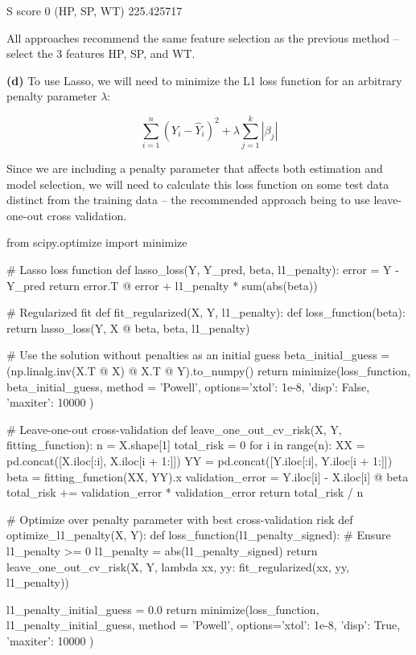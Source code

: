 \begin{console}
              S       score
0  (HP, SP, WT)  225.425717
\end{console}

All approaches recommend the same feature selection as the previous
method -- select the 3 features HP, SP, and WT.

\textbf{(d)} To use Lasso, we will need to minimize the L1 loss function
for an arbitrary penalty parameter \(\lambda\):

\[ \sum_{i=1}^n (Y_i - \hat{Y}_i)^2 + \lambda \sum_{j=1}^k | \beta_j | \]

Since we are including a penalty parameter that affects both estimation
and model selection, we will need to calculate this loss function on
some test data distinct from the training data -- the recommended
approach being to use leave-one-out cross validation.

\begin{python}
from scipy.optimize import minimize

# Lasso loss function
def lasso_loss(Y, Y_pred, beta, l1_penalty):
    error = Y - Y_pred
    return error.T @ error + l1_penalty * sum(abs(beta))

# Regularized fit
def fit_regularized(X, Y, l1_penalty):
    def loss_function(beta):
        return lasso_loss(Y, X @ beta, beta, l1_penalty)
    
    # Use the solution without penalties as an initial guess
    beta_initial_guess = (np.linalg.inv(X.T @ X) @ X.T @ Y).to_numpy()
    return minimize(loss_function, beta_initial_guess, method = 'Powell',
                    options={'xtol': 1e-8, 'disp': False, 'maxiter': 10000 }) 

# Leave-one-out cross-validation
def leave_one_out_cv_risk(X, Y, fitting_function):
    n = X.shape[1]
    total_risk = 0
    for i in range(n):
        XX = pd.concat([X.iloc[:i], X.iloc[i + 1:]])
        YY = pd.concat([Y.iloc[:i], Y.iloc[i + 1:]])
        beta = fitting_function(XX, YY).x
        validation_error = Y.iloc[i] - X.iloc[i] @ beta
        total_risk += validation_error * validation_error
    return total_risk / n

# Optimize over penalty parameter with best cross-validation risk
def optimize_l1_penalty(X, Y):
    def loss_function(l1_penalty_signed):
        # Ensure l1_penalty >= 0
        l1_penalty = abs(l1_penalty_signed)
        return leave_one_out_cv_risk(X, Y, lambda xx, yy: fit_regularized(xx, yy, l1_penalty))
    
    l1_penalty_initial_guess = 0.0
    return minimize(loss_function, l1_penalty_initial_guess, method = 'Powell',
                   options={'xtol': 1e-8, 'disp': True, 'maxiter': 10000 })
\end{python}


